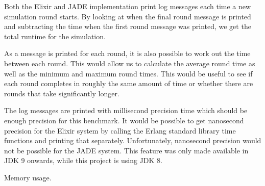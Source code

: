 Both the Elixir and JADE implementation print log messages each time a new simulation round starts.
By looking at when the final round message is printed and subtracting the time when the first round message was printed, we get the total runtime for the simulation.

As a message is printed for each round, it is also possible to work out the time between each round.
This would allow us to calculate the average round time as well as the minimum and maximum round times.
This would be useful to see if each round completes in roughly the same amount of time or whether there are rounds that take significantly longer.

The log messages are printed with millisecond precision time which should be enough precision for this benchmark.
It would be possible to get nanosecond precision for the Elixir system by calling the Erlang standard library time functions and printing that separately.
Unfortunately, nanosecond precision would not be possible for the JADE system.
This feature was only made available in JDK 9 onwards, while this project is using JDK 8.

Memory usage.
